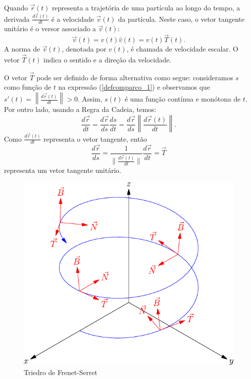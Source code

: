 \begin{obs} Quando $\vec{r}(t)$ representa a trajetória de uma partícula ao longo do tempo, a derivada $\frac{d\vec{r}(t)}{dt} $ é a velocidade $\vec{v}(t)$ da partícula. Neste caso, o vetor tangente unitário é o versor associado a $\vec{v}(t)$:
$$\vec{v}(t)=v(t) \hat{v}(t)=v(t) \vec{T}(t).$$
A norma de $\vec{v}(t)$, denotada por $v(t)$, é chamada de velocidade escalar. O vetor $\vec{T}(t)$ indica o sentido e a direção da velocidade.
\end{obs}

O vetor $\vec{T}$ pode ser definido de forma alternativa como segue: consideramos $s$ como função de $t$ na expressão (\ref{defcomparco_1}) e observamos que $s'(t)=\left\|\frac{d\vec{r}(t)}{dt}\right\|>0$. Assim, $s(t)$ é uma função contínua e monótona de $t$. Por outro lado, usando a Regra da Cadeia, temos:
$$
\frac{d\vec{r}}{dt}=\frac{d\vec{r}}{ds}\frac{ds}{dt}=\frac{d\vec{r}}{ds}\left\|\frac{d\vec{r}(t)}{dt}\right\|.
$$
Como $\frac{d\vec{r}(t)}{dt}$ representa o vetor tangente, então
$$
\frac{d\vec{r}}{ds}=\frac{1}{\|\frac{d\vec{r}(t)}{dt}\|}\frac{d\vec{r}}{dt}=\vec{T}
$$
representa um vetor tangente unitário.


\begin{figure}%
\begin{center}
    \includegraphics{./cap_curvas/figs/helice_TNB}
\caption{Triedro de Frenet-Serret}\label{Frenet_Serret}
  \end{center}
\end{figure}


